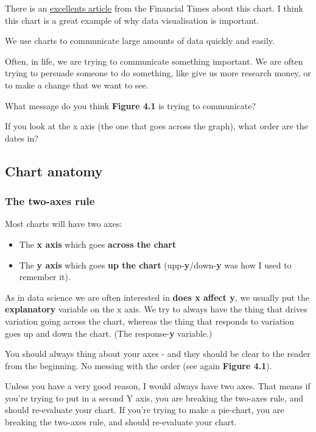 \documentclass[
]{book}
\begin{document}
There is an \href{https://ftalphaville.ft.com/2020/05/18/1589795135000/When-axes-get-truly-evil/}{excellents article} from the Financial Times about this chart. I think this chart is a great example of why data visualisation is important.

We use charts to communicate large amounts of data quickly and easily.

Often, in life, we are trying to communicate something important. We are often trying to persuade someone to do something, like give us more research money, or to make a change that we want to see.

What message do you think \textbf{Figure 4.1} is trying to communicate?

If you look at the x axis (the one that goes across the graph), what order are the dates in?

\hypertarget{vis_anatomy}{%
\subsection{Chart anatomy}\label{vis_anatomy}}

\hypertarget{the-two-axes-rule}{%
\subsubsection{The two-axes rule}\label{the-two-axes-rule}}

Most charts will have two axes:

\begin{itemize}
\item
  The \textbf{x axis} which goes \textbf{across the chart}
\item
  The \textbf{y axis} which goes \textbf{up the chart} (upp-\textbf{y}/down-\textbf{y} was how I used to remember it).
\end{itemize}

As in data science we are often interested in \textbf{does x affect y}, we usually put the \textbf{explanatory} variable on the x axis. We try to always have the thing that drives variation going across the chart, whereas the thing that responds to variation goes up and down the chart. (The response-\textbf{y} variable.)

You should always thing about your axes - and they should be clear to the reader from the beginning. No messing with the order (see again \textbf{Figure 4.1}).

Unless you have a very good reason, I would always have two axes. That means if you're trying to put in a second Y axis, you are breaking the two-axes rule, and should re-evaluate your chart. If you're trying to make a pie-chart, you are breaking the two-axes rule, and should re-evaluate your chart.
\end{document}
